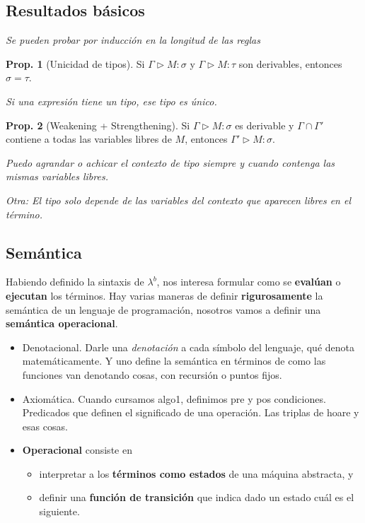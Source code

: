 \documentclass{report}
\theoremstyle{definition} %
\newtheorem{proposition}{Prop.}[chapter]
\newcommand{\lambdab}{\lambda^b}
\newcommand{\tipa}[3]{#1 \rhd #2 : #3} %
\newcommand{\Gtipa}[2]{\tipa{\Gamma}{#1}{#2}}
\begin{document}
\subsection{Resultados básicos}

\textit{Se pueden probar por inducción en la longitud de las reglas}

\begin{proposition}[Unicidad de tipos]
    Si $\Gtipa{M}{\sigma}$ y $\Gtipa{M}{\tau}$ son derivables, entonces $\sigma
    = \tau$.

    \textit{Si una expresión tiene un tipo, ese tipo es único.}
\end{proposition}

\begin{proposition}[Weakening + Strengthening]
    Si $\Gtipa{M}{\sigma}$ es derivable y $\Gamma \cap \Gamma'$ contiene a todas
    las variables libres de $M$, entonces $\tipa{\Gamma'}{M}{\sigma}$.

    \textit{Puedo agrandar o achicar el contexto de tipo siempre y cuando contenga las mismas variables libres.}

    \textit{Otra: El tipo solo depende de las variables del contexto que aparecen libres en el término.}
\end{proposition}

\subsection{Semántica}

Habiendo definido la sintaxis de $\lambdab$, nos interesa formular como se
\textbf{evalúan} o \textbf{ejecutan} los términos. Hay varias maneras de definir
\textbf{rigurosamente} la semántica de un lenguaje de programación, nosotros
vamos a definir una \textbf{semántica operacional}.

\begin{itemize}
    \item Denotacional. Darle una \textit{denotación} a cada símbolo del
    lenguaje, qué denota matemáticamente. Y uno define la semántica en términos
    de como las funciones van denotando cosas, con recursión o puntos fijos.
    \item Axiomática. Cuando cursamos algo1, definimos pre y pos condiciones.
    Predicados que definen el significado de una operación. Las triplas de hoare y
    esas cosas.
    \item \textbf{Operacional} consiste en
    \begin{itemize}
        \item interpretar a los \textbf{términos como estados} de una máquina
        abstracta, y
        \item definir una \textbf{función de transición} que indica dado un
        estado cuál es el siguiente. 
    \end{itemize}
\end{itemize}
\end{document}
